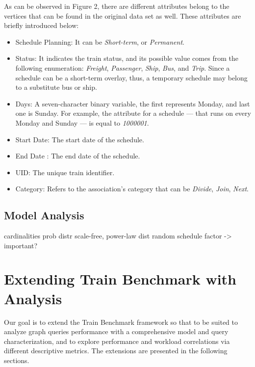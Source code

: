 As can be observed in Figure 2, %
there are different attributes belong to the vertices that can be found in the original data set as well. These attributes are briefly introduced below:
\begin{itemize}
	\item{\textsf{Schedule Planning}}: It can be \textit{Short-term}, or \textit{Permanent}.
	\item{\textsf{Status}}: It indicates the train status, and its possible value comes from the following enumeration: \textit{Freight}, \textit{Passenger}, \textit{Ship}, \textit{Bus}, and \textit{Trip}. Since a schedule can be a short-term overlay, thus, a temporary schedule may belong to a substitute bus or ship.
	\item{\textsf{Days}}: A seven-character binary variable, the first represents Monday, and last one is Sunday. For example, the attribute for a schedule --- that runs on every Monday and Sunday --- is equal to \textit{1000001}.
	\item{\textsf{Start Date}}: The start date of the schedule.
	\item{\textsf{End Date}} : The end date of the schedule.
	\item{\textsf{UID}}: The unique train identifier.
	\item{\textsf{Category}}: Refers to the association's category that can be \textit{Divide}, \textit{Join}, \textit{Next}.
\end{itemize}


\subsection{Model Analysis}\label{sec:model_analysis}
cardinalities
	prob distr
	scale-free, power-law dist
	random schedule factor -> important?





\section{Extending Train Benchmark with Analysis}

Our goal is to extend the Train Benchmark framework so that to be suited to analyze graph queries performance with a comprehensive model and query characterization, and to explore performance and workload correlations via different descriptive metrics. The extensions are presented in the following sections.

